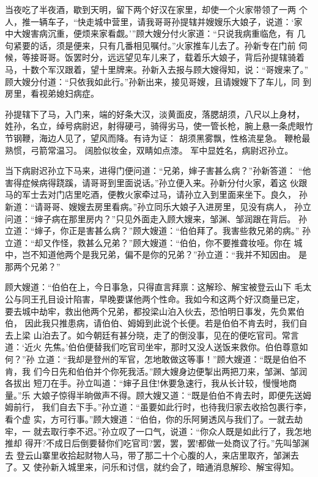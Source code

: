 当夜吃了半夜酒，歇到天明，留下两个好汉在家里，却使一个火家带领了一两
个人，推一辆车子，“快走城中营里，请我哥哥孙提辖并嫂嫂乐大娘子，说道：‘家
中大嫂害病沉重，便烦来家看觑。’”顾大嫂分付火家道：“只说我病重临危，有
几句紧要的话，须是便来，只有几番相见嘱付。”火家推车儿去了。孙新专在门前
伺候，等接哥哥。饭罢时分，远远望见车儿来了，载着乐大娘子，背后孙提辖骑着
马，十数个军汉跟着，望十里牌来。孙新入去报与顾大嫂得知，说：“哥嫂来了。”
顾大嫂分付道：“只依我如此行。”孙新出来，接见哥嫂，且请嫂嫂下了车儿，同
到房里，看视弟媳妇病症。

孙提辖下了马，入门来，端的好条大汉，淡黄面皮，落腮胡须，八尺以上身材，
姓孙，名立，绰号病尉迟，射得硬弓，骑得劣马，使一管长枪，腕上悬一条虎眼竹
节钢鞭，海边人见了，望风而降。有诗为证：
胡须黑雾飘，性格流星急。
鞭枪最熟惯，弓箭常温习。
阔脸似妆金，双睛如点漆。
军中显姓名，病尉迟孙立。

当下病尉迟孙立下马来，进得门便问道：“兄弟，婶子害甚么病？”孙新答道：
“他害得症候病得跷蹊，请哥哥到里面说话。”孙立便入来。孙新分付火家，着这
伙跟马的军士去对门店里吃酒，便教火家牵过马，请孙立入到里面来坐下。良久，
孙新道：“请哥哥、嫂嫂去房里看病。”孙立同乐大娘子入进房里，见没有病人，
孙立问道：“婶子病在那里房内？”只见外面走入顾大嫂来，邹渊、邹润跟在背后。
孙立道：“婶子，你正是害甚么病？”顾大嫂道：“伯伯拜了。我害些救兄弟的病。”
孙立道：“却又作怪，救甚么兄弟？”顾大嫂道：“伯伯，你不要推聋妆哑。你在
城中，岂不知道他两个是我兄弟，偏不是你的兄弟？”孙立道：“我并不知因由。
是那两个兄弟？”

顾大嫂道：“伯伯在上，今日事急，只得直言拜禀：这解珍、解宝被登云山下
毛太公与同王孔目设计陷害，早晚要谋他两个性命。我如今和这两个好汉商量已定，
要去城中劫牢，救出他两个兄弟，都投梁山泊入伙去，恐怕明日事发，先负累伯伯，
因此我只推患病，请伯伯、姆姆到此说个长便。若是伯伯不肯去时，我们自去上梁
山泊去了。如今朝廷有甚分晓，走了的倒没事，见在的便吃官司。常言道：‘近火
先焦。’伯伯便替我们吃官司坐牢，那时又没人送饭来救你。伯伯尊意如何？”孙
立道：“我却是登州的军官，怎地敢做这等事！”顾大嫂道：“既是伯伯不肯，我
们今日先和伯伯并个你死我活。”顾大嫂身边便掣出两把刀来，邹渊、邹润各拔出
短刀在手。孙立叫道：“婶子且住!休要急速行，我从长计较，慢慢地商量。”乐
大娘子惊得半晌做声不得。顾大嫂又道：“既是伯伯不肯去时，即便先送姆姆前行，
我们自去下手。”孙立道：“虽要如此行时，也待我归家去收拾包裹行李，看个虚
实，方可行事。”顾大嫂道：“伯伯，你的乐阿舅透风与我们了。一就去劫牢，一
就去取行李不迟。”孙立叹了一口气，说道：“你众人既是如此行了，我怎地推却
得开?不成日后倒要替你们吃官司?罢，罢，罢!都做一处商议了行。”先叫邹渊去
登云山寨里收拾起财物人马，带了那二十个心腹的人，来店里取齐，邹渊去了。又
使孙新入城里来，问乐和讨信，就约会了，暗通消息解珍、解宝得知。

